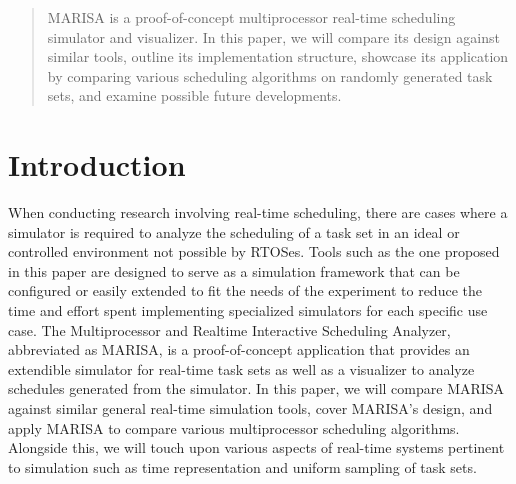 \documentclass[conference,compsoc]{IEEEtran}
\begin{document}
\begin{abstract}
MARISA is a proof-of-concept multiprocessor real-time scheduling simulator and visualizer. In this paper, we will compare its design against similar tools, outline its implementation structure, showcase its application by comparing various scheduling algorithms on randomly generated task sets, and examine possible future developments.
\end{abstract}





%
\IEEEpeerreviewmaketitle



\section{Introduction}
When conducting research involving real-time scheduling, there are cases where a simulator is required to analyze the scheduling of a task set in an ideal or controlled environment not possible by RTOSes. Tools such as the one proposed in this paper are designed to serve as a simulation framework that can be configured or easily extended to fit the needs of the experiment to reduce the time and effort spent implementing specialized simulators for each specific use case. The Multiprocessor and Realtime Interactive Scheduling Analyzer, abbreviated as MARISA, is a proof-of-concept application that provides an extendible simulator for real-time task sets as well as a visualizer to analyze schedules generated from the simulator. In this paper, we will compare MARISA against similar general real-time simulation tools, cover MARISA's design, and apply MARISA to compare various multiprocessor scheduling algorithms. Alongside this, we will touch upon various aspects of real-time systems pertinent to simulation such as time representation and uniform sampling of task sets.
\end{document}
